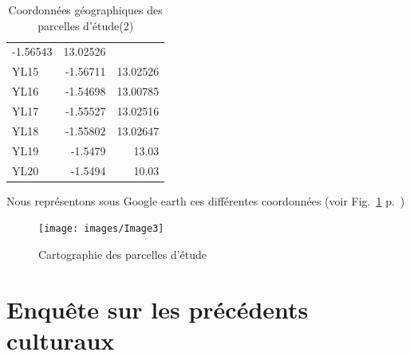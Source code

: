 \documentclass[a4paper,11pt]{article}
\begin{document}
\begin{table}
\begin{center}
\begin{tabular}{|l|r|r|}
       -1.56543 & 13.02526 \\ YL15 & -1.56711 & 13.02526 \\ YL16 &
       -1.54698 & 13.00785 \\ YL17 & -1.55527 & 13.02516 \\ YL18 &
       -1.55802 & 13.02647 \\ YL19 & -1.5479 & 13.03 \\ YL20 & -1.5494
       & 10.03 \\ \hline
     \end{tabular}
      \caption{Coordonnées géographiques des parcelles d'étude(2)}
      \label{tableau:Suite des coordonnées géographiques des parcelles}
    \end{center}
\end{table}
       
Nous représentons sous Google earth ces différentes coordonnées (voir Fig.~\ref{fig-Image3}
p.~\pageref{fig-Image3})


\begin{figure}
  \begin{center}
    \texttt{[image: images/Image3]}
  \end{center}
  \caption{Cartographie des parcelles d'étude}
  \label{fig-Image3}
\end{figure}

\newpage
\section{Enquête sur les précédents culturaux}
\end{document}
